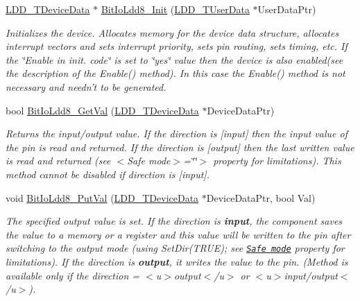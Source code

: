 \begin{DoxyCompactItemize}
\item 
\hyperlink{group___p_e___types__module_gac5cf1362f1f0e3a2ce71b1bf2276d091}{L\-D\-D\-\_\-\-T\-Device\-Data} $\ast$ \hyperlink{group___bit_io_ldd8__module_gaf922e9a73d696fecea61e351f8cfed5e}{Bit\-Io\-Ldd8\-\_\-\-Init} (\hyperlink{group___p_e___types__module_ga0b66a73f87238a782318aa0be7578e35}{L\-D\-D\-\_\-\-T\-User\-Data} $\ast$User\-Data\-Ptr)
\begin{DoxyCompactList}\small\item\em Initializes the device. Allocates memory for the device data structure, allocates interrupt vectors and sets interrupt priority, sets pin routing, sets timing, etc. If the \char`\"{}\-Enable
    in init. code\char`\"{} is set to \char`\"{}yes\char`\"{} value then the device is also enabled(see the description of the Enable() method). In this case the Enable() method is not necessary and needn't to be generated. \end{DoxyCompactList}\item 
bool \hyperlink{group___bit_io_ldd8__module_ga371380a918d26bee32b0703204a92fc4}{Bit\-Io\-Ldd8\-\_\-\-Get\-Val} (\hyperlink{group___p_e___types__module_gac5cf1362f1f0e3a2ce71b1bf2276d091}{L\-D\-D\-\_\-\-T\-Device\-Data} $\ast$Device\-Data\-Ptr)
\begin{DoxyCompactList}\small\item\em Returns the input/output value. If the direction is \mbox{[}input\mbox{]} then the input value of the pin is read and returned. If the direction is \mbox{[}output\mbox{]} then the last written value is read and returned (see $<$\-Safe mode$>$=\char`\"{}\char`\"{}$>$ property for limitations). This method cannot be disabled if direction is \mbox{[}input\mbox{]}. \end{DoxyCompactList}\item 
void \hyperlink{group___bit_io_ldd8__module_ga49be1e682a047e7bcbdf2396cddb54f7}{Bit\-Io\-Ldd8\-\_\-\-Put\-Val} (\hyperlink{group___p_e___types__module_gac5cf1362f1f0e3a2ce71b1bf2276d091}{L\-D\-D\-\_\-\-T\-Device\-Data} $\ast$Device\-Data\-Ptr, bool Val)
\begin{DoxyCompactList}\small\item\em The specified output value is set. If the direction is {\bfseries  input}, the component saves the value to a memory or a register and this value will be written to the pin after switching to the output mode (using {\ttfamily Set\-Dir(\-T\-R\-U\-E)}; see \href{BitIOProperties.html#SafeMode}{\tt Safe mode} property for limitations). If the direction is {\bfseries output}, it writes the value to the pin. (Method is available only if the direction = $<$u$>${\ttfamily output}$<$/u$>$ or $<$u$>${\ttfamily  input/output}$<$/u$>$). \end{DoxyCompactList}\item 

\end{DoxyCompactItemize}
